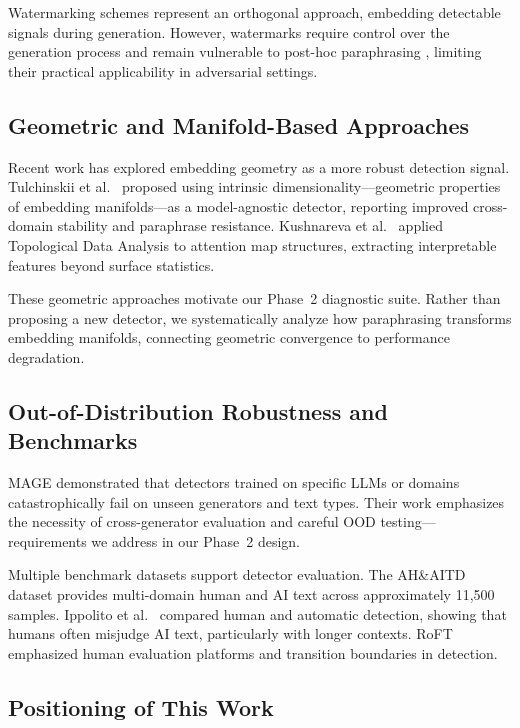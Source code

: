 \documentclass[conference]{IEEEtran}
\begin{document}
Watermarking schemes \cite{kirchenbauer2023watermark} represent an orthogonal approach, embedding detectable signals during generation. However, watermarks require control over the generation process and remain vulnerable to post-hoc paraphrasing \cite{sadasivan2023can}, limiting their practical applicability in adversarial settings.

\subsection{Geometric and Manifold-Based Approaches}

Recent work has explored embedding geometry as a more robust detection signal. Tulchinskii et al.~\cite{tulchinskii2023intrinsic} proposed using intrinsic dimensionality—geometric properties of embedding manifolds—as a model-agnostic detector, reporting improved cross-domain stability and paraphrase resistance. Kushnareva et al.~\cite{kushnareva2021artificial} applied Topological Data Analysis to attention map structures, extracting interpretable features beyond surface statistics.

These geometric approaches motivate our Phase~2 diagnostic suite. Rather than proposing a new detector, we systematically analyze how paraphrasing transforms embedding manifolds, connecting geometric convergence to performance degradation.

\subsection{Out-of-Distribution Robustness and Benchmarks}

MAGE \cite{li2024mage} demonstrated that detectors trained on specific LLMs or domains catastrophically fail on unseen generators and text types. Their work emphasizes the necessity of cross-generator evaluation and careful OOD testing—requirements we address in our Phase~2 design.

Multiple benchmark datasets support detector evaluation. The AH\&AITD dataset \cite{akram2023human} provides multi-domain human and AI text across approximately 11,500 samples. Ippolito et al.~\cite{ippolito2020automatic} compared human and automatic detection, showing that humans often misjudge AI text, particularly with longer contexts. RoFT \cite{dugan2020real} emphasized human evaluation platforms and transition boundaries in detection.

\subsection{Positioning of This Work}
\end{document}
